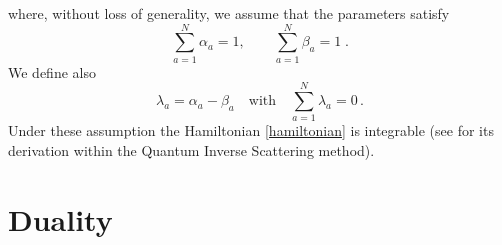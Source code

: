 \documentclass[10pt]{article}
\numberwithin{equation}{section}
\numberwithin{equation}{subsection}
\begin{document}
where, without loss of generality,  we assume that the parameters satisfy
\begin{equation}\label{ratesConditions}
	\sum_{a=1}^{N}\alpha_{a}=1,\qquad\sum_{a=1}^{N}\beta_{a}=1\;.
\end{equation} 
We define also 
\begin{equation}\label{lambdaConditions}
	\lambda_{a}=\alpha_{a}-\beta_{a}\quad\text{with}\quad \sum_{a=1}^{N}\lambda_{a}=0\,.
\end{equation}
Under these assumption the Hamiltonian \ref{hamiltonian} is integrable (see \cite{vanicat2017exact} for its derivation within the Quantum Inverse Scattering method). 


\section{Duality}\label{sectionDuality}
\end{document}
